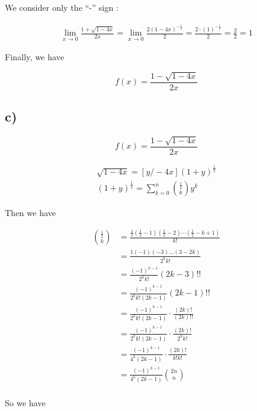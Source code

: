 \documentclass[a4paper,11pt]{report}
\begin{document}
We consider only the ``-'' sign :

\begin{gather*}
  \lim_{x \to 0} \frac{1 + \sqrt{1-4x}}{2x} = \lim_{x \to 0}
  \frac{2(1-4x)^{-\frac{1}{2}}}{2} = \frac{2 \cdot (1)^{-\frac{1}{2}}}{2} =
  \frac{2}{2} = 1
\end{gather*}

Finally, we have

\[
  f(x) = \frac{1-\sqrt{1-4x}}{2x}
\]

\subsection*{c)}

\[
  f(x) = \frac{1-\sqrt{1-4x}}{2x}
\]

\begin{gather*}
  \sqrt{1-4x} = [y/-4x] (1+y)^{\frac{1}{2}} \\
  (1+y)^{\frac{1}{2}} = \sum_{k = 0}^{n} \binom{\frac{1}{2}}{k}y^k
\end{gather*}

Then we have

\begin{align*}
  \binom{\frac{1}{2}}{k} &= \frac{\frac{1}{2}(\frac{1}{2}-1)(\frac{1}{2}-2)\cdots(\frac{1}{2}-k+1)}{k!}\\
                         &= \frac{1(-1)(-3)\dots(3-2k)}{2^kk!}\\
                         &= \frac{(-1)^{k-1}}{2^kk!}(2k-3)!!\\
                         &= \frac{(-1)^{k-1}}{2^kk!(2k-1)}(2k-1)!!\\
                         &= \frac{(-1)^{k-1}}{2^kk!(2k-1)}\cdot\frac{(2k)!}{(2k)!!}\\
                         &= \frac{(-1)^{k-1}}{2^kk!(2k-1)}\cdot\frac{(2k)!}{2^kk!}\\
                         &= \frac{(-1)^{k-1}}{4^k(2k-1)}\cdot\frac{(2k)!}{k!k!}\\
                         &= \frac{(-1)^{k-1}}{4^k(2k-1)}\binom{2n}{n}\\
\end{align*}

So we have
\end{document}

